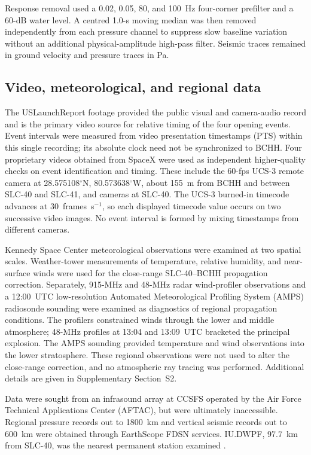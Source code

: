 \documentclass[]{seismica}
\begin{document}
Response removal used a 0.02, 0.05, 80, and 100~Hz four-corner prefilter and a
60-dB water level. A centred 1.0-s moving median was then removed independently
from each pressure channel to suppress slow baseline variation without an
additional physical-amplitude high-pass filter. Seismic traces remained in
ground velocity and pressure traces in Pa.

\subsection{Video, meteorological, and regional data}

The USLaunchReport footage \citep{uslaunchreport_amos6_video_2016} provided
the public visual and camera-audio record and is the primary video source
for relative timing of the four opening events. Event intervals were
measured from video presentation timestamps (PTS) within this single
recording; its absolute clock need not be synchronized to BCHH. Four
proprietary videos obtained from SpaceX were used as independent
higher-quality checks on event identification and timing. These include
the 60-fps UCS-3 remote camera at 28.575108$^\circ$N, 80.573638$^\circ$W,
about 155~m from BCHH and between SLC-40 and SLC-41, and cameras at
SLC-40. The UCS-3 burned-in timecode advances at 30~frames~s$^{-1}$,
so each displayed timecode value occurs on two successive video images.
No event interval is formed by mixing timestamps from different cameras.

Kennedy Space Center meteorological observations were examined at two
spatial scales. Weather-tower measurements of temperature, relative
humidity, and near-surface winds were used for the close-range SLC-40--BCHH
propagation correction. Separately, 915-MHz and 48-MHz radar wind-profiler
observations and a 12:00~UTC low-resolution
Automated Meteorological Profiling System (AMPS) radiosonde
sounding were examined as diagnostics of regional propagation conditions.
The profilers constrained winds through the lower and middle atmosphere;
48-MHz profiles at 13:04 and 13:09~UTC bracketed the principal explosion.
The AMPS sounding provided temperature and wind observations into the lower
stratosphere. These regional observations were not used to alter the
close-range correction, and no atmospheric ray tracing was performed.
Additional details are given in Supplementary Section~S2.

Data were sought from an infrasound array at CCSFS operated by the Air
Force Technical Applications Center (AFTAC), but were ultimately
inaccessible. Regional pressure records out to 1800~km and vertical
seismic records out to 600~km were obtained through EarthScope FDSN
services. IU.DWPF, 97.7~km from SLC-40, was the nearest permanent station
examined \citep{asl_gsn_iu_1988}.
\end{document}
